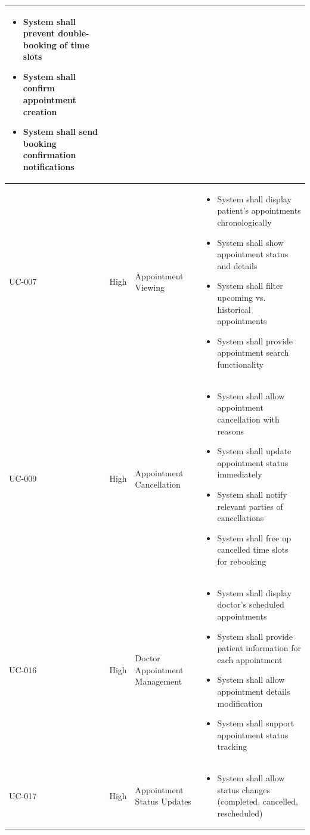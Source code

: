 \documentclass[12pt,a4paper]{article}
\begin{document}
\begin{longtable}{|p{1.2cm}|p{2.5cm}|p{3.5cm}|p{6.8cm}|}
\begin{itemize}[leftmargin=*,topsep=1pt,partopsep=0pt,parsep=0pt,itemsep=1pt]
\item System shall prevent double-booking of time slots
\item System shall confirm appointment creation
\item System shall send booking confirmation notifications
\end{itemize} \\
\hline
UC-007 & High & Appointment Viewing & 
\begin{itemize}[leftmargin=*,topsep=1pt,partopsep=0pt,parsep=0pt,itemsep=1pt]
\item System shall display patient's appointments chronologically
\item System shall show appointment status and details
\item System shall filter upcoming vs. historical appointments
\item System shall provide appointment search functionality
\end{itemize} \\
\hline
UC-009 & High & Appointment Cancellation & 
\begin{itemize}[leftmargin=*,topsep=1pt,partopsep=0pt,parsep=0pt,itemsep=1pt]
\item System shall allow appointment cancellation with reasons
\item System shall update appointment status immediately
\item System shall notify relevant parties of cancellations
\item System shall free up cancelled time slots for rebooking
\end{itemize} \\
\hline
UC-016 & High & Doctor Appointment Management & 
\begin{itemize}[leftmargin=*,topsep=1pt,partopsep=0pt,parsep=0pt,itemsep=1pt]
\item System shall display doctor's scheduled appointments
\item System shall provide patient information for each appointment
\item System shall allow appointment details modification
\item System shall support appointment status tracking
\end{itemize} \\
\hline
UC-017 & High & Appointment Status Updates & 
\begin{itemize}[leftmargin=*,topsep=1pt,partopsep=0pt,parsep=0pt,itemsep=1pt]
\item System shall allow status changes (completed, cancelled, rescheduled)

\end{itemize}
\end{longtable}
\end{document}
